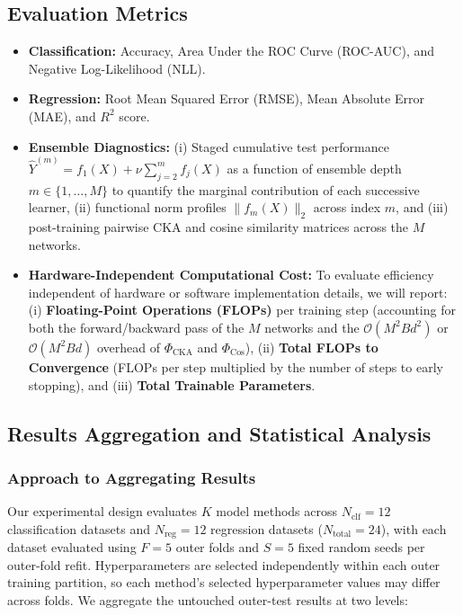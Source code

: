 \documentclass[11pt, a4paper]{article}
\begin{document}
\subsection{Evaluation Metrics}
\begin{itemize}
    \item \textbf{Classification:} Accuracy, Area Under the ROC Curve (ROC-AUC), and Negative Log-Likelihood (NLL).
    \item \textbf{Regression:} Root Mean Squared Error (RMSE), Mean Absolute Error (MAE), and $R^2$ score.
    \item \textbf{Ensemble Diagnostics:} (i) Staged cumulative test performance $\hat{Y}^{(m)} = f_1(X) + \nu \sum_{j=2}^m f_j(X)$ as a function of ensemble depth $m \in \{1, \dots, M\}$ to quantify the marginal contribution of each successive learner, (ii) functional norm profiles $\|f_m(X)\|_2$ across index $m$, and (iii) post-training pairwise CKA and cosine similarity matrices across the $M$ networks.
    \item \textbf{Hardware-Independent Computational Cost:} To evaluate efficiency independent of hardware or software implementation details, we will report: (i) \textbf{Floating-Point Operations (FLOPs)} per training step (accounting for both the forward/backward pass of the $M$ networks and the $\mathcal{O}(M^2 B d^2)$ or $\mathcal{O}(M^2 B d)$ overhead of $\Phi_{\text{CKA}}$ and $\Phi_{\text{Cos}}$), (ii) \textbf{Total FLOPs to Convergence} (FLOPs per step multiplied by the number of steps to early stopping), and (iii) \textbf{Total Trainable Parameters}.
\end{itemize}


\subsection{Results Aggregation and Statistical Analysis}
\subsubsection{Approach to Aggregating Results}
Our experimental design evaluates $K$ model methods across $N_{\text{clf}} = 12$ classification datasets and $N_{\text{reg}} = 12$ regression datasets ($N_{\text{total}} = 24$), with each dataset evaluated using $F = 5$ outer folds and $S = 5$ fixed random seeds per outer-fold refit. Hyperparameters are selected independently within each outer training partition, so each method's selected hyperparameter values may differ across folds. We aggregate the untouched outer-test results at two levels:
\end{document}
